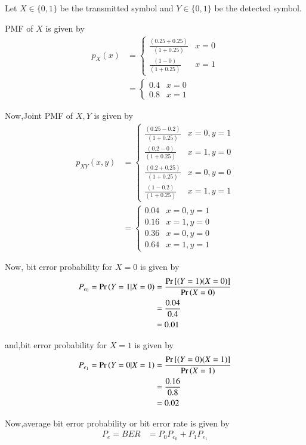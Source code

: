 \documentclass[journal,12pt,twocolumn]{IEEEtran}
\begin{document}
Let $X \in \{0,1\}$ be the transmitted symbol and $Y \in \{0,1\}$ be the detected symbol.

PMF of $X$ is given by
\begin{align}
p_X(x) &= 
\begin{cases} 
\frac{(0.25+0.25)}{(1+0.25)} & x=0 \\     
\frac{(1-0)}{(1+0.25)} & x=1
\end{cases}
\\
&=
\begin{cases} 
0.4 & x=0 \\     
0.8 & x=1
\end{cases}
\end{align}

Now,Joint PMF of $X,Y$ is given by
\begin{align}
p_{XY}(x,y) &= 
\begin{cases}  
\frac{(0.25-0.2)}{(1+0.25)} & x=0,y=1 \\
\frac{(0.2-0)}{(1+0.25)}  & x=1,y=0 \\
\frac{(0.2+0.25)}{(1+0.25)} & x=0,y=0 \\
\frac{(1-0.2)}{(1+0.25)} & x=1,y=1
\end{cases}
\\
&=
\begin{cases}  
0.04 & x=0,y=1 \\
0.16 & x=1,y=0 \\
0.36 & x=0,y=0 \\
0.64 & x=1,y=1
\end{cases}
\end{align}

Now, bit error probability for $X=0$ is given by
\begin{align}
    P_{e_{0}} = \Pr\left(Y=1|X=0\right) &= \frac{\text{Pr}{}\left[(Y=1)(X=0)\right]}{\Pr\left(X=0\right)} \\
    &= \frac{0.04}{0.4} \\
    &= 0.01
\end{align}

and,bit error probability for $X=1$ is given by
\begin{align}
    P_{e_{1}} = \Pr\left(Y=0|X=1\right) &= \frac{\text{Pr}{}\left[(Y=0)(X=1)\right]}{\Pr\left(X=1\right)} \\
    &= \frac{0.16}{0.8} \\
    &= 0.02
\end{align}

Now,average bit error probability or bit error rate is given by
\begin{align}
    P_e =BER &= P_0P_{e_{0}}+P_1P_{e_{1}}
\end{align}
\end{document}
